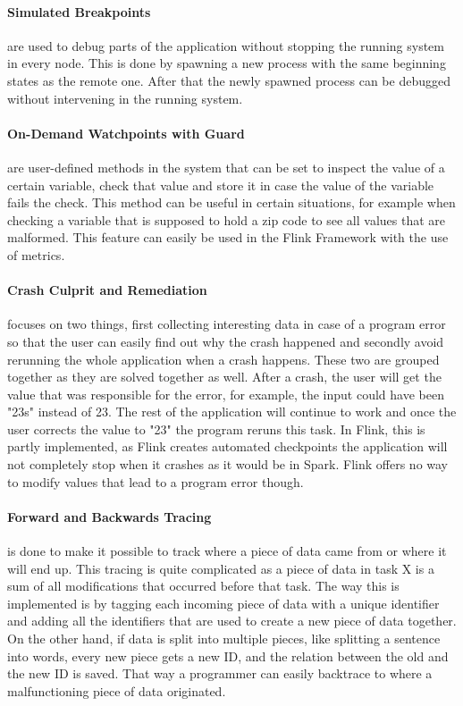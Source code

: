\paragraph{Simulated Breakpoints} are used to debug parts of the application without stopping the running system in every node. This is done by spawning a new process with the same beginning states as the remote one. After that the newly spawned process can be debugged without intervening in the running system.

\paragraph{On-Demand Watchpoints with Guard} are user-defined methods in the system that can be set to inspect the value of a certain variable, check that value and store it in case the value of the variable fails the check. This method can be useful in certain situations, for example when checking a variable that is supposed to hold a zip code to see all values that are malformed. This feature can easily be used in the Flink Framework with the use of metrics.

\paragraph{Crash Culprit and Remediation} focuses on two things, first collecting interesting data in case of a program error so that the user can easily find out why the crash happened and secondly avoid rerunning the whole application when a crash happens. These two are grouped together as they are solved together as well. After a crash, the user will get the value that was responsible for the error, for example, the input could have been "23s" instead of 23. The rest of the application will continue to work and once the user corrects the value to "23" the program reruns this task. In Flink, this is partly implemented, as Flink creates automated checkpoints the application will not completely stop when it crashes as it would be in Spark. Flink offers no way to modify values that lead to a program error though.

\paragraph{Forward and Backwards Tracing} is done to make it possible to track where a piece of data came from or where it will end up. This tracing is quite complicated as a piece of data in task X is a sum of all modifications that occurred before that task. The way this is implemented is by tagging each incoming piece of data with a unique identifier and adding all the identifiers that are used to create a new piece of data together. On the other hand, if data is split into multiple pieces, like splitting a sentence into words, every new piece gets a new ID, and the relation between the old and the new ID is saved. That way a programmer can easily backtrace to where a malfunctioning piece of data originated.

